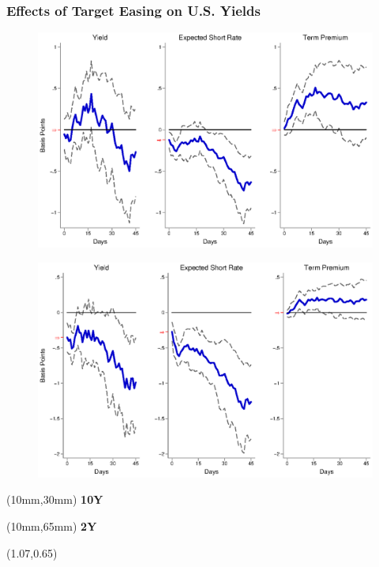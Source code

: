 \documentclass[12pt, aspectratio=169, xcolor=dvipsnames]{beamer}
\begin{document}
\begin{frame}[label=TargetUS]
\frametitle{Effects of Target Easing on U.S. Yields}
\begin{figure}[!htbp]
\begin{center} %
\includegraphics[trim={0cm 0cm 0cm 0cm},clip,height=0.45\textheight,width=0.85\linewidth]{../Figures/LPs/LagDep-FX/Target/US/TargetUSDnomyptp120m.eps}
\par\end{center}
\end{figure}
\vspace{-0.5cm}
\begin{figure}[!htbp]
\begin{center} %
\includegraphics[trim={0cm 0cm 0cm 0.76cm},clip,height=0.45\textheight,width=0.85\linewidth]{../Figures/LPs/LagDep-FX/Target/US/TargetUSDnomyptp24m.eps}
\par\end{center}
\end{figure}
\begin{textblock*}{8mm}(10mm,30mm)
\small \textbf{10Y}
\end{textblock*}
\begin{textblock*}{8mm}(10mm,65mm)
\small \textbf{2Y}
\end{textblock*}
\begin{textblock*}{5cm}(1.07\textwidth,0.65\textheight)
\hyperlink{TargetEM}{}
\end{textblock*}
\end{frame}
\end{document}
